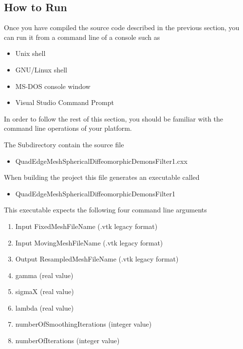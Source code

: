 \documentclass{InsightArticle}
\begin{document}
\begin{center}

\end{center}


\subsection{How to Run}

Once you have compiled the source code described in the previous section, you
can run it from a command line of a console such as

\begin{itemize}
\item Unix shell
\item GNU/Linux shell
\item MS-DOS console window
\item Visual Studio Command Prompt
\end{itemize}

In order to follow the rest of this section, you should be familiar with the
command line operations of your platform.

The Subdirectory  contain the source file 

\begin{itemize}
\item QuadEdgeMeshSphericalDiffeomorphicDemonsFilter1.cxx
\end{itemize}

When building the project this file generates an executable called

\begin{itemize}
\item QuadEdgeMeshSphericalDiffeomorphicDemonsFilter1
\end{itemize}

This executable expects the following four command line arguments

\begin{enumerate}
\item Input FixedMeshFileName (.vtk legacy format)
\item Input MovingMeshFileName (.vtk legacy format)
\item Output ResampledMeshFileName (.vtk legacy format)
\item gamma (real value)
\item sigmaX (real value)
\item lambda (real value)
\item numberOfSmoothingIterations (integer value)
\item numberOfIterations (integer value)
\end{enumerate}
\end{document}
